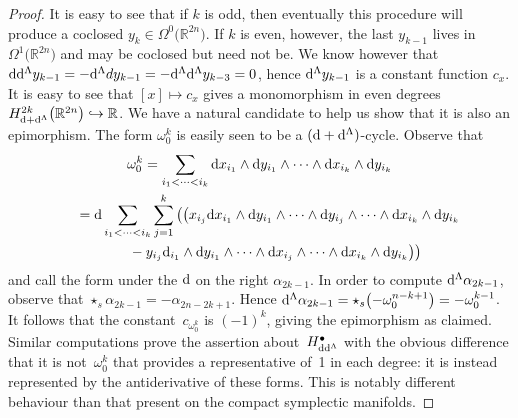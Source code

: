 \documentclass[10pt,a4paper]{amsart}
\numberwithin{equation}{section}
\begin{document}
\begin{proof}
It is easy to see that if $k$ is odd, then eventually this procedure will produce a coclosed $y_{k}\in\Omega^{0}\big(\mathbb{R}^{2n}\big)$. If $k$ is even, however, the last $y_{k-1}$ lives in $\Omega^{1}\big(\mathbb{R}^{2n}\big)$ and may be coclosed but need not be. We know however that ${\rm d}{\rm d}^{\Lambda}y_{k-1}=-{\rm d}^{\Lambda}dy_{k-1}=-{\rm d}^{\Lambda}{\rm d}^{\Lambda} y_{k-3}=0$, hence ${\rm d}^{\Lambda}y_{k-1}$ is a constant function $c_x$. It is easy to see that $[x]\mapsto c_x$ gives a monomorphism in even degrees $H^{2k}_{{\rm d}+{\rm d}^{\Lambda}}\big(\mathbb{R}^{2n}\big)\hookrightarrow \mathbb{R}$. We have a natural candidate to help us show that it is also an epimorphism. The form $\omega_0^k$ is easily seen to be a $({\rm d}+{\rm d}^{\Lambda})$-cycle. Observe that
\begin{gather*}
\omega_0^k = \sum_{i_1<\cdots<i_k}{\rm d}x_{i_1}\wedge {\rm d}y_{i_1}\wedge\cdots \wedge {\rm d}x_{i_k}\wedge {\rm d} y_{i_k} \\
\hphantom{\omega_0^k}{} ={\rm d}\sum_{i_1<\cdots<i_k}\sum_{j=1}^{k}\big(\big(x_{i_j}{\rm d} x_{i_1}\wedge {\rm d} y_{i_1}\wedge\cdots\wedge {\rm d}y_{i_j}\wedge\cdots\wedge {\rm d}x_{i_k}\wedge {\rm d} y_{i_k} \\
 \hphantom{\omega_0^k=}{} - y_{i_j}{\rm d}_{i_1}\wedge {\rm d}y_{i_1}\wedge\cdots\wedge {\rm d} x_{i_j}\wedge\cdots\wedge {\rm d}x_{i_k}\wedge {\rm d}y_{i_k} \big) \big)
\end{gather*}
and call the form under the ${\rm d}$ on the right $\alpha_{2k-1}$. In order to compute ${\rm d}^{\Lambda}\alpha_{2k-1}$, observe that $\star_s\alpha_{2k-1}=-\alpha_{2n-2k+1}$. Hence ${\rm d}^{\Lambda} \alpha_{2k-1}=\star_s\big({-}\omega_0^{n-k+1}\big)=-\omega_0^{k-1}$. It follows that the constant~$c_{\omega_0^{k}}$ is $(-1)^k$, giving the epimorphism as claimed. Similar computations prove the assertion about~$H^{\bullet}_{{\rm d}{\rm d}^{\Lambda}}$ with the obvious difference that it is not~$\omega_0^k$ that provides a representative of~1 in each degree: it is instead represented by the antiderivative of these forms. This is notably different behaviour than that present on the compact symplectic manifolds.
\end{proof}
\end{document}
